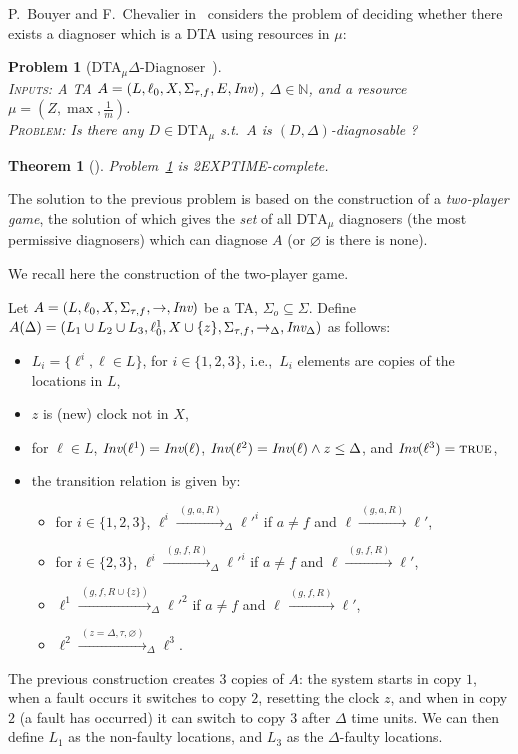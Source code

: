 \documentclass[letterpaper,10pt,conference]{ieeeconf}  \IEEEoverridecommandlockouts                              \overrideIEEEmargins
\def\ie{{i.e.},~}
\def\st{{s.t.}~}
\newtheorem{prob}{Problem}  \newtheorem{definition}{Definition}
\newtheorem{theorem}{Theorem}
\newcommand{\setN}{\mathbb N}
\def\tauac{\tau}
\def\dtamu{DTA$_\mu$\xspace}
\def\true{\mbox{\textsc{true}}}
\begin{document}
P.~Bouyer and F.~Chevalier in~\cite{Bouyerfossacs05} considers the
problem of deciding whether there exists a diagnoser which is a DTA
using resources in $\mu$:

\begin{prob}[\dtamu $\Delta$-Diagnoser~\cite{Bouyerfossacs05}] \label{prob-dtamu} \mbox{} \\
  \textsc{Inputs:} A TA $A=(L,\ell_0,X,\Sigma_{\tauac,f},E,\inv)$,
  $\Delta \in \setN$,
  and a resource $\mu=(Z,\max,\frac{1}{m})$.\\
  \textsc{Problem:} Is there any $D \in \text{DTA}_\mu$ \st $A$ is
  $(D,\Delta)$-dia\-gnosable ?
\end{prob}
\begin{theorem}[\cite{Bouyerfossacs05}]
Problem~\ref{prob-dtamu}  is 2EXPTIME-complete.
\end{theorem}

The solution to the previous problem is based on the construction of a
\emph{two-player game}, the solution of which gives the \emph{set} of
all $\text{DTA}_\mu$ diagnosers (the most permissive diagnosers) which
can diagnose $A$ (or $\varnothing$ is there is none).

We recall here the construction of the two-player game.

Let $A=(L,\ell_0,X,\Sigma_{\tauac,f},\rightarrow,\inv)$ be a TA, $\Sigma_o
\subseteq \Sigma$.  Define $A(\Delta)=(L_1 \cup L_2 \cup
L_3,\ell^1_0,X \cup
\{z\},\Sigma_{\tauac,f},\rightarrow_\Delta,\inv_\Delta)$ as follows:
\begin{itemize}
\item $L_i=\{\ell^i, \ell \in L\}$, for $i\in \{1,2,3\}$, \ie $L_i$
  elements are copies of the locations in $L$,
\item $z$ is (new) clock not in $X$,
\item for $\ell \in L$, $\textit{Inv}(\ell^1)=\textit{Inv}(\ell)$,
  $\textit{Inv}(\ell^2)=\textit{Inv}(\ell) \wedge z \leq \Delta$, and 
  $\inv(\ell^3)=\true$,
\item the transition relation is given by:
  \begin{itemize}
  \item for $i \in \{1,2,3\}$, $\ell^i \xrightarrow{\ (g,a,R)\
    }_\Delta \ell'^i$ if $a \neq f$ and $\ell \xrightarrow{\ (g,a,R)\
    } \ell'$,
  \item for $i \in \{2,3\}$, $\ell^i \xrightarrow{\ (g,f,R)\ }_\Delta
    \ell'^i$ if $a \neq f$ and $\ell \xrightarrow{\ (g,f,R)\ } \ell'$,
  \item $\ell^1 \xrightarrow{\ (g,f,R \cup \{z\})\ }_\Delta
    \ell'^2$ if $a \neq f$ and $\ell \xrightarrow{\ (g,f,R)\ } \ell'$,
  \item $\ell^2 \xrightarrow{\ (z=\Delta,\tauac,\varnothing)\ }_\Delta
    \ell^3$.
  \end{itemize}
\end{itemize}
The previous construction creates $3$ copies of $A$: the system starts
in copy $1$, when a fault occurs it switches to copy $2$, resetting
the clock $z$, and when in copy $2$ (a fault has occurred) it can
switch to copy $3$ after $\Delta$ time units.  We can then define
$L_1$ as the non-faulty locations, and $L_3$ as the $\Delta$-faulty
locations.
\end{document}
